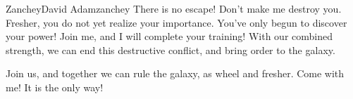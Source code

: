 \begin{welcome}{Zanchey}{David Adam}{zanchey}
There is no escape! Don't make me destroy you. Fresher, you do not yet realize your importance. You've only begun to discover your power! Join me, and I will complete your training! With our combined strength, we can end this destructive conflict, and bring order to the galaxy.

Join us, and together we can rule the galaxy, as wheel and fresher. Come with me! It is the only way!

\end{welcome}


